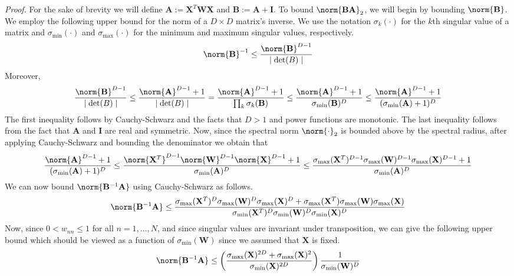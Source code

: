 \documentclass[mnsc,blindrev]{informs3}
\newcommand{\bA}{\mathbf{A}}
\newcommand{\bB}{\mathbf{B}}
\newcommand{\bX}{\mathbf{X}}
\newcommand{\bI}{\mathbf{I}}
\newcommand{\bW}{\mathbf{W}}
\begin{document}
  \noindent \emph{Proof.} For the sake of brevity we will define $\bA := \bX^T \bW \bX$ and $\bB := \bA + \bI$. To bound $\norm{\bB \bA}_2$, we will begin by bounding $\norm{\bB}$. We employ the following upper bound for the norm of a $D \times D$ matrix's inverse. We use the notation $\sigma_k(\cdot)$ for the $k$th singular value of a matrix and $\sigma_{\min}(\cdot)$ and $\sigma_{\max}(\cdot)$ for the minimum and maximum singular values, respectively. 
  \begin{equation*}
      \norm{\bB}^{-1} \leq \frac{\norm{\bB}^{D-1}}{\mid \mathrm{det}(B)\mid}
  \end{equation*}
  Moreover,
  \begin{gather*}
      \frac{\norm{\bB}^{D-1}}{\mid \mathrm{det}(B)\mid} \leq \frac{\norm{\bA}^{D-1} + 1}{\mid \mathrm{det}(B)\mid} 
      =  \frac{\norm{\bA}^{D-1} + 1}{\prod_k \sigma_k(\bB)} 
      \leq \frac{\norm{\bA}^{D-1} + 1}{\sigma_{\min}(\bB)^D} 
      \leq  \frac{\norm{\bA}^{D-1} + 1}{(\sigma_{\min}(\bA) + 1)^D} 
  \end{gather*}
    The first inequality follows by Cauchy-Schwarz and the facts that  $D>1$ and power functions are monotonic. The last inequality follows from the fact that $\bA$ and $\bI$ are real and symmetric.
    Now, since the spectral norm $\norm{\cdot}_2$ is bounded above by the spectral radius, after applying Cauchy-Schwarz and bounding the denominator we obtain that
    \begin{gather*}
        \frac{\norm{\bA}^{D-1} + 1}{(\sigma_{\min}(\bA) + 1)^D} \leq \frac{\norm{\bX^T}^{D-1}\norm{\bW}^{D-1}\norm{\bX}^{D-1} + 1}{\sigma_{\min}(\bA)^D} \leq \frac{\sigma_{\max}(\bX^T)^{D-1}\sigma_{\max}(\bW)^{D-1}\sigma_{\max}(\bX)^{D-1} + 1}{\sigma_{\min}(\bA)^D}
    \end{gather*}
    We can now bound $\norm{\bB^{-1}\bA}$ using Cauchy-Schwarz as follows.
    \begin{equation*}
        \norm{\bB^{-1}\bA} \leq \frac{\sigma_{\max}(\bX^T)^{D}\sigma_{\max}(\bW)^{D}\sigma_{\max}(\bX)^{D} + \sigma_{\max}(\bX^T)\sigma_{\max}(\bW)\sigma_{\max}(\bX)}{\sigma_{\min}(\bX^T)^{D}\sigma_{\min}(\bW)^{D}\sigma_{\min}(\bX)^{D}}
    \end{equation*}
    Now, since $0<w_{nn}\leq 1$ for all $n=1,\ldots,N$, and since singular values are invariant under transposition, we can give the following upper bound which should be viewed as a function of $\sigma_{\min}(\bW)$ since we assumed that $\bX$ is fixed. 
    \begin{equation*}
        \norm{\bB^{-1}\bA} \leq \left(\frac{\sigma_{\max}(\bX)^{2D} + \sigma_{\max}(\bX)^2}{\sigma_{\min}(\bX)^{2D}}\right) \frac{1}{\sigma_{\min}(\bW)^D}
    \end{equation*}
\end{document}
